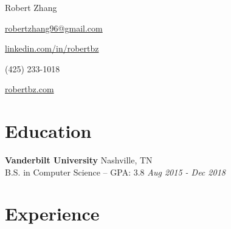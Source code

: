 \documentclass[letterpaper,11pt]{article}
\makeatletter
\newcommand{\resumeSubheading}[4]{
    \vspace{-3pt}
      \textbf{\fontspec{Helvetica Neue}\Large#1} \vspace{3pt} \hfill#2 \\
      {\fontspec{Helvetica}#3} \hfill\textit{#4} \\
    \vspace{-3pt}
}
\newcommand{\resumeSubHeadingListStart}{\begin{itemize}[leftmargin=*]}
\makeatother
\begin{document}
\setmainfont{Helvetica Light} 

\begin{minipage}[t]{0.65\textwidth}
    \vspace{-\topskip}
  \fontsize{55}{30}\selectfont {}Robert Zhang
\end{minipage}
\begin{minipage}[t]{0.34\textwidth}
  \vspace{-\topskip}
   \small
   \flushright
   \href{mailto:robertzhang96@gmail.com}{robertzhang96@gmail.com} \enspace \faEnvelope
   
   \href{https://www.linkedin.com/in/robertbz/}{linkedin.com/in/robertbz} \enspace \faLinkedin
   
   (425) 233-1018 \enspace \faPhone
   
   \href{https://www.robertbz.com/}{robertbz.com} \enspace \faUser
\end{minipage}


\section{Education}
      \vspace{-3pt}
        \textbf{\Large Vanderbilt University} \vspace{3pt} \hfill Nashville, TN \\
        {B.S. in Computer Science --  GPA: 3.8} \hfill\textit{Aug 2015 - Dec 2018} \\
      \vspace{-3pt}

\section{Experience}
\end{document}

